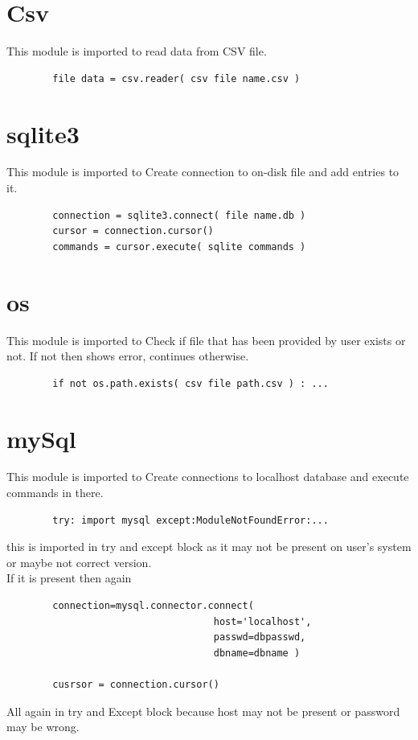 \documentclass[12pt,a4paper]{report}
\begin{document}
        \section{Csv}
        This module is imported to read data from CSV file.
        \begin{verbatim}
        file data = csv.reader( csv file name.csv )
        \end{verbatim}
        
        \section{sqlite3}
        This module is imported to Create connection to on-disk file and add entries to it.
        \begin{verbatim}
        connection = sqlite3.connect( file name.db )
        cursor = connection.cursor()
        commands = cursor.execute( sqlite commands )
        \end{verbatim}
        
        \section{os}
        This module is imported to Check if file that has been provided by user exists or not. If not then shows error, continues otherwise.
        \begin{verbatim}
        if not os.path.exists( csv file path.csv ) : ...
        \end{verbatim}
        
        \section{mySql}
        This module is imported to Create connections to localhost database and execute commands in there.
        \begin{verbatim}
        try: import mysql except:ModuleNotFoundError:...
        \end{verbatim}
        this is imported in try and except block as it may not be present on user's system or maybe not correct version.\\
        If it is present then again
        \begin{verbatim}
        connection=mysql.connector.connect(
                                    host='localhost',
                                    passwd=dbpasswd,
                                    dbname=dbname )
                                    
        cusrsor = connection.cursor()
        \end{verbatim}
        All again in try and Except block because host may not be present or password may be wrong.
        
\end{document}
